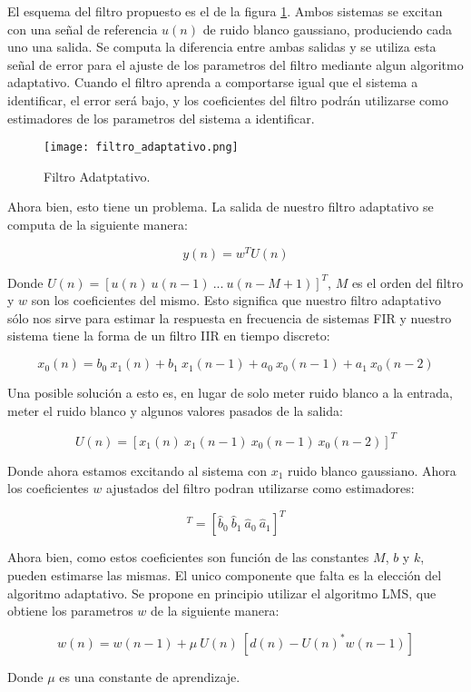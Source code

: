 El esquema del filtro propuesto es el de la figura \ref{fig:filtro_adaptativo}. Ambos sistemas se excitan con una señal de referencia $u(n)$ de ruido blanco gaussiano, produciendo cada uno una salida. Se computa la diferencia entre ambas salidas y se utiliza esta señal de error para el ajuste de los parametros del filtro mediante algun algoritmo adaptativo. Cuando el filtro aprenda a comportarse igual que el sistema a identificar, el error será bajo, y los coeficientes del filtro podrán utilizarse como estimadores de los parametros del sistema a identificar.

\vspace*{\fill}
\begin{figure}[H]
\centering
\texttt{[image: filtro\_adaptativo.png]}
\caption{Filtro Adatptativo.}
\label{fig:filtro_adaptativo} 
\end{figure}
\vspace*{\fill}

Ahora bien, esto tiene un problema. La salida de nuestro filtro adaptativo se computa de la siguiente manera:

\begin{equation*}
	y(n) = w^T U(n)
\end{equation*}

Donde $U(n) = [u(n) \> u(n - 1) \> ... \> u(n - M + 1)]^T$, $M$ es el orden del filtro y $w$ son los coeficientes del mismo. Esto significa que nuestro filtro adaptativo sólo nos sirve para estimar la respuesta en frecuencia de sistemas FIR y nuestro sistema tiene la forma de un filtro IIR en tiempo discreto:

\begin{equation*}
		x_{0}(n) = b_{0} \> x_{1}(n) + b_{1} \> x_{1}(n - 1) + a_{0} \> x_{0}(n - 1) + a_{1} \> x_{0}(n - 2)
\end{equation*}

Una posible solución a esto es, en lugar de solo meter ruido blanco a la entrada, meter el ruido blanco y algunos valores pasados de la salida:

\begin{equation*}
	U(n) = [x_{1}(n) \> x_{1}(n - 1) \> x_{0}(n - 1) \> x_{0}(n - 2)]^T
\end{equation*}

Donde ahora estamos excitando al sistema con $x_{1}$ ruido blanco gaussiano. Ahora los coeficientes $w$ ajustados del filtro podran utilizarse como estimadores:

\begin{equation*}
	[w_{0} \> w_{1} \> w_{2} \> w_{3}]^T  = [\hat{b}_{0} \> \hat{b}_{1} \> \hat{a}_{0} \> \hat{a}_{1}]^T
\end{equation*}

Ahora bien, como estos coeficientes son función de las constantes $M$, $b$ y $k$, pueden estimarse las mismas. El unico componente que falta es la elección del algoritmo adaptativo. Se propone en principio utilizar el algoritmo LMS, que obtiene los parametros $w$ de la siguiente manera:

\begin{equation*}
	w(n) = w(n - 1) + \mu \> U(n) \> [d(n) - U(n)^* w(n - 1)]
\end{equation*}

Donde $\mu$ es una constante de aprendizaje.
